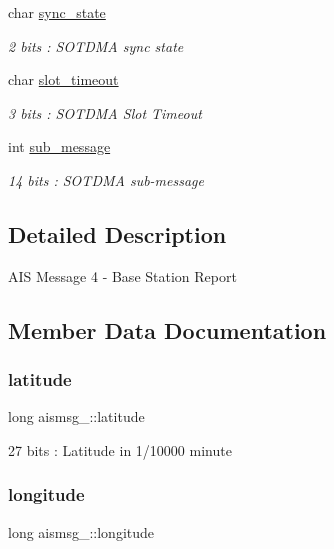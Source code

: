 \begin{DoxyCompactItemize}
char \mbox{\hyperlink{structaismsg__4_a5fceafa9fcd7fc7673fb6e075f555de1}{sync\+\_\+state}}
\begin{DoxyCompactList}\small\item\em 2 bits \+: S\+O\+T\+D\+MA sync state \end{DoxyCompactList}\item 
char \mbox{\hyperlink{structaismsg__4_a97a4bb86143f397dd0f7352365a86f36}{slot\+\_\+timeout}}
\begin{DoxyCompactList}\small\item\em 3 bits \+: S\+O\+T\+D\+MA Slot Timeout \end{DoxyCompactList}\item 
int \mbox{\hyperlink{structaismsg__4_a254346f0018d3d09d2121872cef2d3bf}{sub\+\_\+message}}
\begin{DoxyCompactList}\small\item\em 14 bits \+: S\+O\+T\+D\+MA sub-\/message \end{DoxyCompactList}\end{DoxyCompactItemize}


\subsection{Detailed Description}
A\+IS Message 4 -\/ Base Station Report 

\subsection{Member Data Documentation}
\mbox{\label{structaismsg__4_a911867f9c6e400613305ff3a17ed0fe7}} 
\subsubsection{\texorpdfstring{latitude}{latitude}}
{\footnotesize\ttfamily long aismsg\+\_\+::latitude}



27 bits \+: Latitude in 1/10000 minute 

\mbox{\label{structaismsg__4_a904297794e0662968ec742eeb794a701}} 
\subsubsection{\texorpdfstring{longitude}{longitude}}
{\footnotesize\ttfamily long aismsg\+\_\+::longitude}



